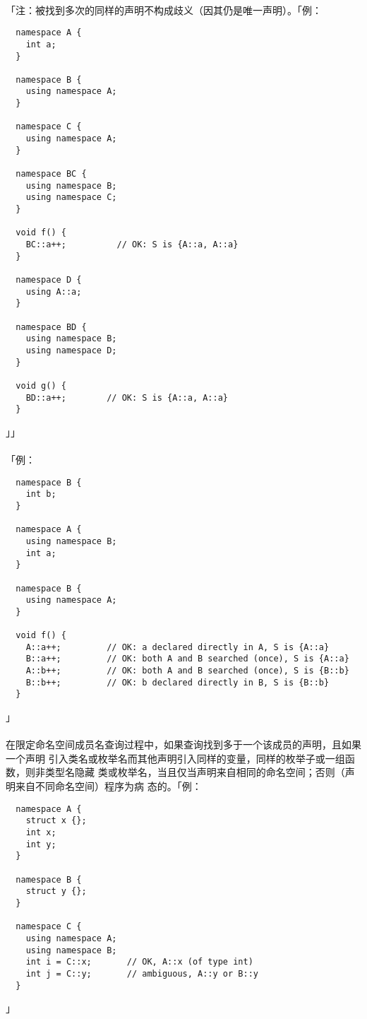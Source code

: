\paragraph{}
「注：被找到多次的同样的声明不构成歧义（因其仍是唯一声明）。「例：
\begin{lstlisting}
  namespace A {
    int a;
  }

  namespace B {
    using namespace A;
  }

  namespace C {
    using namespace A;
  }

  namespace BC {
    using namespace B;
    using namespace C;
  }

  void f() {
    BC::a++;          // OK: S is {A::a, A::a}
  }

  namespace D {
    using A::a;
  }

  namespace BD {
    using namespace B;
    using namespace D;
  }

  void g() {
    BD::a++;        // OK: S is {A::a, A::a}
  }
\end{lstlisting}」」

\paragraph{}
「例：
\begin{lstlisting}
  namespace B {
    int b;
  }

  namespace A {
    using namespace B;
    int a;
  }

  namespace B {
    using namespace A;
  }

  void f() {
    A::a++;         // OK: a declared directly in A, S is {A::a}
    B::a++;         // OK: both A and B searched (once), S is {A::a}
    A::b++;         // OK: both A and B searched (once), S is {B::b}
    B::b++;         // OK: b declared directly in B, S is {B::b}
  }
\end{lstlisting}」

\paragraph{}
在限定命名空间成员名查询过程中，如果查询找到多于一个该成员的声明，且如果一个声明
引入类名或枚举名而其他声明引入同样的变量，同样的枚举子或一组函数，则非类型名隐藏
类或枚举名，当且仅当声明来自相同的命名空间；否则（声明来自不同命名空间）程序为病
态的。「例：
\begin{lstlisting}
  namespace A {
    struct x {};
    int x;
    int y;
  }

  namespace B {
    struct y {};
  }

  namespace C {
    using namespace A;
    using namespace B;
    int i = C::x;       // OK, A::x (of type int)
    int j = C::y;       // ambiguous, A::y or B::y
  }
\end{lstlisting}」

